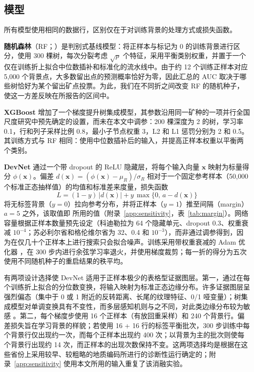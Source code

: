 \documentclass[pdflatex,sn-apa]{sn-jnl}
\begin{document}
\subsection{模型}\label{sec:models}

所有模型使用相同的数据行，区别仅在于对训练背景的处理方式或损失函数。

\textbf{随机森林}（RF；\citealp{Breiman2001}）是判别式基线模型：将正样本与标记为 0 的训练背景进行区分，使用 300 棵树，每次分裂考虑 $\sqrt{p}$ 个特征，采用平衡类别权重，并置于一个仅在训练折上拟合中位数插补和标准化的流水线中。由于约 12 个训练正样本对应 5,000 个背景点，大多数留出点的预测概率恰好为零，因此汇总的 AUC 取决于哪些树恰好为某个留出矿点投票。为此，我们在不同折之间改变 RF 的随机种子，使这一方差反映在所报告的区间中。

\textbf{XGBoost} \citep{Chen2016} 增加了一个梯度提升树集成模型，其参数沿用同一矿种的一项并行全国尺度研究中预先确定的设置，而未在本文中调参：200 棵深度为 2 的树，学习率 0.1，行和列子采样比例 0.8，最小子节点权重 3，L2 和 L1 惩罚分别为 2 和 0.5。其训练方式与 RF 相同：使用中位数插补后的输入，并提高正样本权重以平衡两个类别。

\textbf{DevNet} \citep{Pang2019} 通过一个带 dropout 的 ReLU 隐藏层，将每个输入向量 $\mathbf{x}$ 映射为标量得分 $\phi(\mathbf{x})$。偏差 $d(\mathbf{x}) = (\phi(\mathbf{x}) - \mu_R)/\sigma_R$ 相对于一个固定参考样本（50,000 个标准正态抽样值）的均值和标准差来度量，损失函数
\begin{equation}
L = (1-y)\,|d(\mathbf{x})| + y\,\max\{0,\, a - d(\mathbf{x})\}
\end{equation}
将无标签背景（$y=0$）拉向参考分布，并将正样本（$y=1$）推至间隔（margin）$a = 5$ 之外，该取值即 \citet{Pang2019} 所用的值（附录~\ref{app:sensitivity}，表~\ref{tab:margin}）。网络容量根据正样本数量预先设定（科迪勒拉为 64 个隐藏单元、dropout 0.3、权重衰减 $10^{-4}$；苏必利尔省和格伦维尔省为 32、0.4 和 $10^{-3}$），而非通过调参得到，因为在仅几十个正样本上进行搜索只会拟合噪声。训练采用带权重衰减的 Adam 优化器 \citep{Kingma2014}，在 300 步内进行余弦学习率退火，并使用梯度裁剪；每一折的得分为五次使用不同随机种子的重启结果的秩平均。

有两项设计选择使 DevNet 适用于正样本极少的表格型证据图层。第一，通过在每个训练折上拟合的分位数变换，将输入映射为标准正态边缘分布。许多证据图层呈强烈偏态（集中于 0 或 1 附近的反转距离、长尾的纹理特征、0/1 哑变量）；树集成模型对单调变换具有不变性，而多层感知机则与之不同，对此类边缘分布较为敏感 \citep{Gorishniy2021,Grinsztajn2022}。第二，每个梯度步使用 16 个正样本（有放回重采样）和 240 个背景行。偏差损失旨在学习背景的样貌；若使用 16 + 16 行的标签平衡批次，300 步训练中每个背景行仅出现约一次，而每个正样本出现约 400 次；以背景为主的批次则使每个背景行出现约 14 次，而正样本的出现次数保持不变。这两项选择均是根据在这些省份上采用较早、较粗略的地质编码所进行的诊断性运行确定的；附录~\ref{app:sensitivity} 使用本文所用的输入重复了该消融实验。
\end{document}
